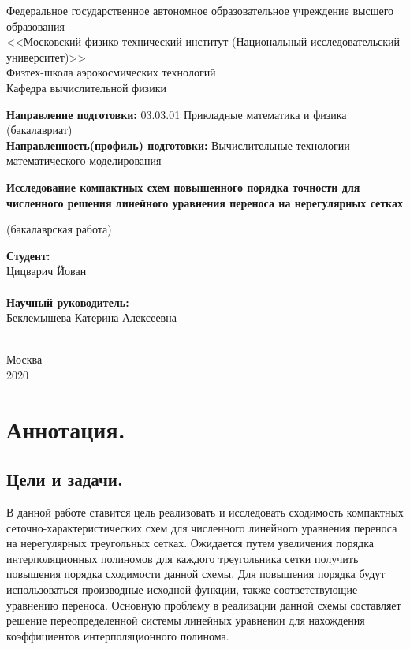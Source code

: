 \documentclass[14pt]{article}
\begin{document}
\begin{center}
\small
Федеральное государственное автономное образовательное учреждение высшего образования\\
<<Московский физико-технический институт (Национальный исследовательский университет)>> \\
Физтех-школа аэрокосмических технологий\\
Кафедра вычислительной физики
\end{center}

\begin{flushleft}
\small
\textbf{Направление подготовки:} 03.03.01 Прикладные математика и физика (бакалавриат)\\
\textbf{Направленность(профиль) подготовки:} Вычислительные технологии математического моделирования\\
\end{flushleft}

\begin{center}
\LARGE
\textbf{Исследование компактных схем повышенного порядка точности для численного решения линейного уравнения переноса на нерегулярных сетках}

\small(бакалаврская работа)
\end{center}


\begin{flushright}

\noindent
\textbf{Студент:} \\
Цицварич Йован\\
\underline{\hspace{3cm}}\\
\textbf{Научный руководитель:}\\
Беклемышева Катерина Алексеевна\\
\underline{\hspace{3cm}}\\

\end{flushright}

\begin{center}
\small
Москва\\
2020
\end{center}

\newpage
\section*{Аннотация.}
\subsection*{Цели и задачи.}
В данной работе ставится цель реализовать и исследовать сходимость компактных сеточно-характеристических схем для численного линейного уравнения переноса на нерегулярных треугольных сетках. Ожидается путем увеличения порядка интерполяционных полиномов для каждого треугольника сетки получить повышения порядка сходимости данной схемы. Для повышения порядка будут использоваться производные исходной функции, также соответствующие уравнению переноса. Основную проблему в реализации данной схемы составляет решение переопределенной системы линейных уравнении для нахождения коэффициентов интерполяционного полинома.
\end{document}
